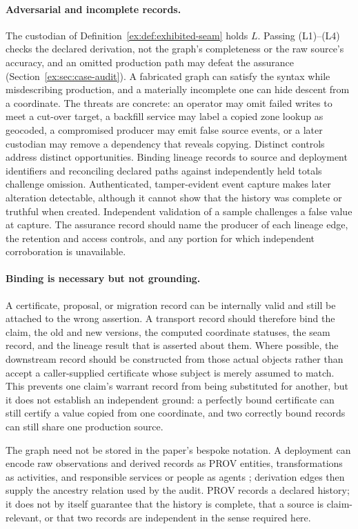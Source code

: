 \documentclass[twocolumn,envcountsect,envcountsame,natbib]{svjour3}
\begin{document}
\paragraph{Adversarial and incomplete records.} The custodian of Definition~\ref{ex:def:exhibited-seam} holds $L$. Passing (L1)--(L4) checks the declared derivation, not the graph's completeness or the raw source's accuracy, and an omitted production path may defeat the assurance (Section~\ref{ex:sec:case-audit}). A fabricated graph can satisfy the syntax while misdescribing production, and a materially incomplete one can hide descent from a coordinate. The threats are concrete: an operator may omit failed writes to meet a cut-over target, a backfill service may label a copied zone lookup as geocoded, a compromised producer may emit false source events, or a later custodian may remove a dependency that reveals copying. Distinct controls address distinct opportunities. Binding lineage records to source and deployment identifiers and reconciling declared paths against independently held totals challenge omission. Authenticated, tamper-evident event capture makes later alteration detectable, although it cannot show that the history was complete or truthful when created. Independent validation of a sample challenges a false value at capture. The assurance record should name the producer of each lineage edge, the retention and access controls, and any portion for which independent corroboration is unavailable.

\paragraph{Binding is necessary but not grounding.}
A certificate, proposal, or migration record can be internally valid and still be attached to the wrong assertion. A transport record should therefore bind the claim, the old and new versions, the computed coordinate statuses, the seam record, and the lineage result that is asserted about them. Where possible, the downstream record should be constructed from those actual objects rather than accept a caller-supplied certificate whose subject is merely assumed to match. This prevents one claim's warrant record from being substituted for another, but it does not establish an independent ground: a perfectly bound certificate can still certify a value copied from one coordinate, and two correctly bound records can still share one production source.

The graph need not be stored in the paper's bespoke notation. A deployment can encode raw observations and derived records as PROV entities, transformations as activities, and responsible services or people as agents \citep{w3cprovdm2013}; derivation edges then supply the ancestry relation used by the audit. PROV records a declared history; it does not by itself guarantee that the history is complete, that a source is claim-relevant, or that two records are independent in the sense required here.
\end{document}
